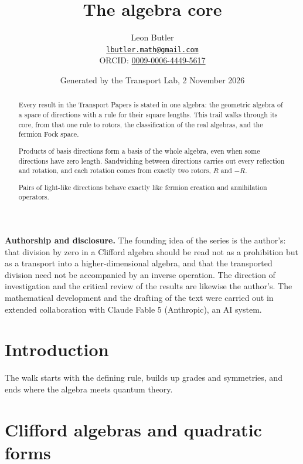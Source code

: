 \documentclass[11pt]{article}
\title{\bfseries The algebra core}
\author{Leon Butler\\ \normalsize\href{mailto:lbutler.math@gmail.com}{\texttt{lbutler.math@gmail.com}}\\ \normalsize ORCID: \href{https://orcid.org/0009-0006-4449-5617}{0009-0006-4449-5617}}
\date{Generated by the Transport Lab, 2 November 2026}
\theoremstyle{definition}
\theoremstyle{plain}
\begin{document}
\maketitle
\begin{abstract}
\normalsize
Every result in the Transport Papers is stated in one algebra: the geometric algebra of a space of directions with a rule for their square lengths. This trail walks through its core, from that one rule to rotors, the classification of the real algebras, and the fermion Fock space.

Products of basis directions form a basis of the whole algebra, even when some directions have zero length. Sandwiching between directions carries out every reflection and rotation, and each rotation comes from exactly two rotors, $R$ and $-R$.

Pairs of light-like directions behave exactly like fermion creation and annihilation operators.
\end{abstract}
\newpage
\noindent \textbf{Authorship and disclosure. }The founding idea of the series is the author's: that division by zero in a Clifford algebra should be read not as a prohibition but as a transport into a higher-dimensional algebra, and that the transported division need not be accompanied by an inverse operation. The direction of investigation and the critical review of the results are likewise the author's. The mathematical development and the drafting of the text were carried out in extended collaboration with Claude Fable 5 (Anthropic), an AI system.

\noindent{}
\newpage

\section*{Introduction}
The walk starts with the defining rule, builds up grades and symmetries, and ends where the algebra meets quantum theory.

\section{Clifford algebras and quadratic forms}
\end{document}
